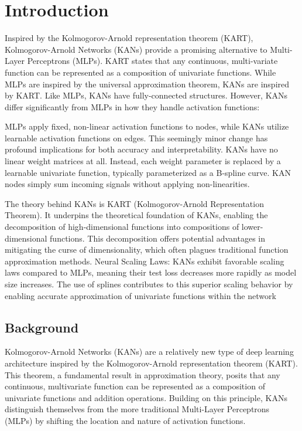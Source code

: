 \setcounter{equation}{0}

\chapter{Introduction}

Inspired by the Kolmogorov-Arnold representation theorem (KART), Kolmogorov-Arnold Networks (KANs) provide a promising alternative to Multi-Layer Perceptrons (MLPs). KART states that any continuous, multi-variate function can be represented as a composition of univariate functions. While MLPs are inspired by the universal approximation theorem, KANs are inspired by KART. Like MLPs, KANs have fully-connected structures. However, KANs differ significantly from MLPs in how they handle activation functions:

MLPs apply fixed, non-linear activation functions to nodes, while KANs utilize learnable activation functions on edges. This seemingly minor change has profound implications for both accuracy and interpretability. KANs have no linear weight matrices at all. Instead, each weight parameter is replaced by a learnable univariate function, typically parameterized as a B-spline curve. KAN nodes simply sum incoming signals without applying non-linearities.

The theory behind KANs is KART (Kolmogorov-Arnold Representation Theorem). It underpins the theoretical foundation of KANs, enabling the decomposition of high-dimensional functions into compositions of lower-dimensional functions. This decomposition offers potential advantages in mitigating the curse of dimensionality, which often plagues traditional function approximation methods.
Neural Scaling Laws: KANs exhibit favorable scaling laws compared to MLPs, meaning their test loss decreases more rapidly as model size increases. The use of splines contributes to this superior scaling behavior by enabling accurate approximation of univariate functions within the network

\clearpage

\section{Background}

Kolmogorov-Arnold Networks (KANs) are a relatively new type of deep learning architecture inspired by the Kolmogorov-Arnold representation theorem (KART). This theorem, a fundamental result in approximation theory, posits that any continuous, multivariate function can be represented as a composition of univariate functions and addition operations. Building on this principle, KANs distinguish themselves from the more traditional Multi-Layer Perceptrons (MLPs) by shifting the location and nature of activation functions.

